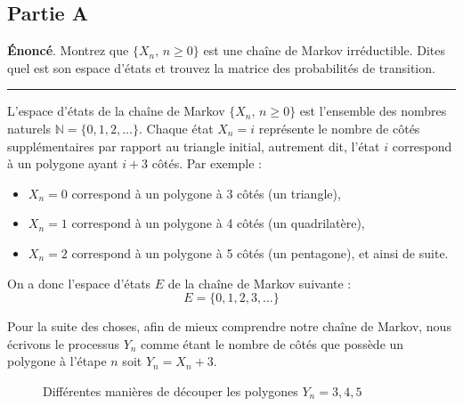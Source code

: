 \documentclass{article}
\begin{document}
\subsection*{Partie A}
\textbf{Énoncé}. Montrez que $\{X_n,\,n\ge0\}$ est une chaîne de Markov irréductible.
Dites quel est son espace d'états et trouvez la matrice des probabilités de transition.
\vspace{.2cm}
\hrule
\vspace{.4cm}
L’espace d’états de la chaîne de Markov \(\{X_n,\,n\geq0\}\) est l’ensemble des nombres naturels \(\mathbb{N} = \{0, 1, 2, \dots\}\). Chaque état \(X_n = i\) représente le nombre de côtés supplémentaires par rapport au triangle initial, autrement dit, l'état \(i\) correspond à un polygone ayant \(i + 3\) côtés. Par exemple :
\begin{itemize}
    \item \(X_n = 0\) correspond à un polygone à 3 côtés (un triangle),
    \item \(X_n = 1\) correspond à un polygone à 4 côtés (un quadrilatère),
    \item \(X_n = 2\) correspond à un polygone à 5 côtés (un pentagone), et ainsi de suite.
\end{itemize}

On a donc l’espace d’états $E$ de la chaîne de Markov suivante :
\[
    E = \{0, 1, 2, 3, \dots\}
\]

Pour la suite des choses, afin de mieux comprendre notre chaîne de Markov, nous écrivons 
le processus $Y_n$ comme étant le nombre de côtés que possède un polygone à l'étape $n$ 
soit $Y_n=X_n+3$.

\newpage
\begin{figure}[h]
    \centering
    \resizebox{0.6\textwidth}{!}{}
    \caption{Différentes manières de découper les polygones $Y_n=3,4,5$}
\end{figure}
\end{document}
